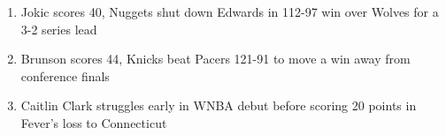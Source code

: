 \begin{enumerate}
\item Jokic scores 40, Nuggets shut down Edwards in 112-97 win over Wolves for a 3-2 series lead
\item Brunson scores 44, Knicks beat Pacers 121-91 to move a win away from conference finals
\item Caitlin Clark struggles early in WNBA debut before scoring 20 points in Fever{\textquoteright}s loss to Connecticut\end{enumerate}